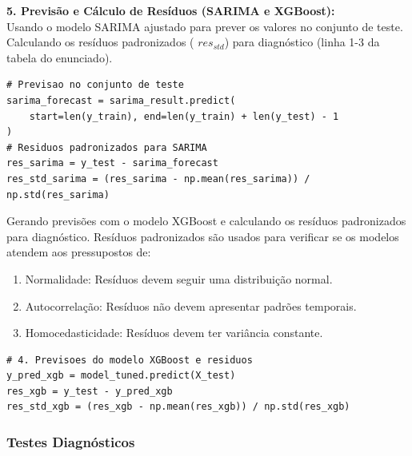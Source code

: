 \documentclass[a4paper, 12pt]{article}
\begin{document}
\textbf{5. Previsão e Cálculo de Resíduos (SARIMA e XGBoost):}\\
Usando o modelo SARIMA ajustado para prever os valores no conjunto de teste. Calculando os resíduos padronizados ( $res_{std}$) para diagnóstico (linha 1-3 da tabela do enunciado).
\begin{lstlisting}[style=python]
# Previsao no conjunto de teste
sarima_forecast = sarima_result.predict(
    start=len(y_train), end=len(y_train) + len(y_test) - 1
)
# Residuos padronizados para SARIMA
res_sarima = y_test - sarima_forecast
res_std_sarima = (res_sarima - np.mean(res_sarima)) / np.std(res_sarima)
\end{lstlisting}

Gerando previsões com o modelo XGBoost e calculando os resíduos padronizados para diagnóstico. Resíduos padronizados são usados para verificar se os modelos atendem aos pressupostos de: 

\begin{enumerate}
    \item Normalidade: Resíduos devem seguir uma distribuição normal.
    \item Autocorrelação: Resíduos não devem apresentar padrões temporais.
    \item Homocedasticidade: Resíduos devem ter variância constante.
\end{enumerate}

\begin{lstlisting}[style=python]
# 4. Previsoes do modelo XGBoost e residuos
y_pred_xgb = model_tuned.predict(X_test)
res_xgb = y_test - y_pred_xgb
res_std_xgb = (res_xgb - np.mean(res_xgb)) / np.std(res_xgb)
\end{lstlisting}


\subsubsection{Testes Diagnósticos}
\end{document}
